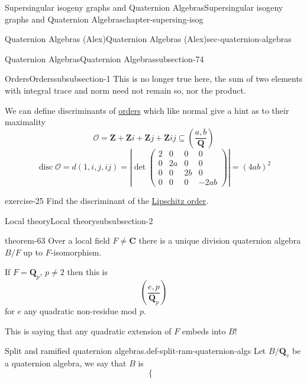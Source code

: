 \documentclass[oneside,10pt,]{book}
\numberwithin{equation}{section}
\newcommand{\legendre}[2]{\left(\frac{#1}{#2}\right)}
\newcommand{\ZZ}{\mathbf{Z}}
\newcommand{\QQ}{\mathbf{Q}}
\newcommand{\CC}{\mathbf{C}}
\newcommand{\ints}{\mathcal{O}}
\DeclareMathOperator{\disc}{disc}
\newcommand{\amp}{&}
\begin{document}
\begin{chapterptx}{Supersingular isogeny graphs and Quaternion Algebras}{}{Supersingular isogeny graphs and Quaternion Algebras}{}{}{chapter-supersing-isog}
\begin{sectionptx}{Quaternion Algebras (Alex)}{}{Quaternion Algebras (Alex)}{}{}{sec-quaternion-algebras}
\begin{subsectionptx}{Quaternion Algebras}{}{Quaternion Algebras}{}{}{subsection-74}
\begin{subsubsectionptx}{Orders}{}{Orders}{}{}{subsubsection-1}
This is no longer true here, the sum of two elements with integral trace and norm need not remain so, nor the product.%
\par
\hypertarget{p-918}{}%
We can define discriminants of \hyperref[def-order-quaternion]{orders} which like normal give a hint as to their maximality%
\begin{equation*}
\ints = \ZZ + \ZZ i + \ZZ j + \ZZ ij \subseteq \legendre{a,b}{\QQ}
\end{equation*}
%
\begin{equation*}
\disc \ints  = d(1,i,j,ij) = \left| \det\begin{pmatrix} 2 \amp 0 \amp 0\amp 0 \\ 0 \amp 2a \amp 0 \amp 0 \\ 0 \amp 0 \amp 2b \amp 0 \\ 0 \amp 0 \amp 0 \amp -2ab\end{pmatrix}\right| = (4ab)^2
\end{equation*}
%
\begin{inlineexercise}{}{exercise-25}%
\hypertarget{p-919}{}%
Find the discriminant of the \hyperref[ex-lipshitz-order]{Lipschitz order}.%
\end{inlineexercise}
\end{subsubsectionptx}
%
%
\typeout{************************************************}
\typeout{************************************************}
%
\begin{subsubsectionptx}{Local theory}{}{Local theory}{}{}{subsubsection-2}
\begin{theorem}{}{}{theorem-63}%
\hypertarget{p-920}{}%
Over a local field \(F \ne \CC\) there is a unique division quaternion algebra \(B/F\) up to \(F\)-isomorphism.%
\par
\hypertarget{p-921}{}%
If \(F = \QQ_p\), \(p\ne 2\) then this is%
\begin{equation*}
\legendre{e,p}{\QQ_p}
\end{equation*}
for \(e\) any quadratic non-residue mod \(p\).%
\par
\hypertarget{p-922}{}%
This is saying that any quadratic extension of \(F\) embeds into \(B\)!%
\end{theorem}
\begin{definition}{Split and ramified quaternion algebras.}{def-split-ram-quaternion-algs}%
\hypertarget{p-923}{}%
Let \(B/\QQ_v\) be a quaternion algebra, we say that \(B\) is%
\begin{equation*}
\begin{cases}

\end{cases}
\end{equation*}
\end{definition}
\end{subsubsectionptx}
\end{subsectionptx}
\end{sectionptx}
\end{chapterptx}
\end{document}
